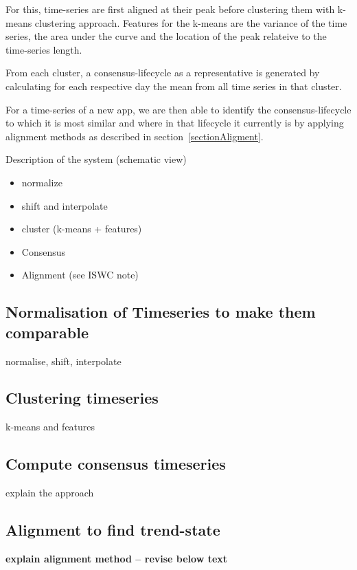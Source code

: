 \documentclass{sigchi}
\begin{document}
For this, time-series are first aligned at their peak before clustering them with k-means clustering approach.
Features for the k-means are the variance of the time series, the area under the curve and the location of the peak relateive to the time-series length.

From each cluster, a consensus-lifecycle as a representative is generated by calculating for each respective day the mean from all time series in that cluster. 

For a time-series of a new app, we are then able to identify the consensus-lifecycle to which it is most similar and where in that lifecycle it currently is by applying alignment methods as described in section~\ref{sectionAligment}.



Description of the system (schematic view)
\begin{itemize}
 \item normalize
 \item shift and interpolate
 \item cluster (k-means + features)
 \item Consensus
 \item Alignment (see ISWC note)
\end{itemize}
\subsection{Normalisation of Timeseries to make them comparable}
normalise, shift, interpolate
\subsection{Clustering timeseries}
k-means and features
\subsection{Compute consensus timeseries}
explain the approach
\subsection{Alignment to find trend-state}\label{sectionAlignment}
\textbf{explain alignment method -- revise below text}
\end{document}
